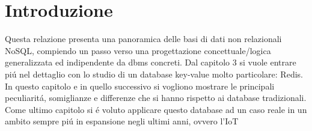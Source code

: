 \chapter*{Introduzione}
Questa relazione presenta una panoramica delle basi di dati non relazionali NoSQL, compiendo
un passo verso una progettazione concettuale/logica generalizzata ed indipendente da dbms concreti.
Dal capitolo 3 si vuole entrare piú nel dettaglio con lo studio di un database key-value molto particolare: Redis.
In questo capitolo e in quello successivo si vogliono mostrare le principali peculiaritá, somiglianze e differenze
che si hanno rispetto ai database tradizionali.
Come ultimo capitolo si é voluto applicare questo database ad un caso reale in un ambito sempre piú in espansione
negli ultimi anni, ovvero l'IoT
